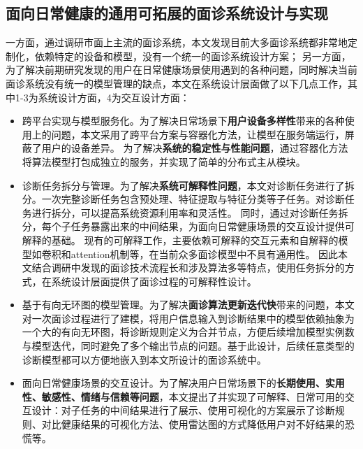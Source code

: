 \subsection{面向日常健康的通用可拓展的面诊系统设计与实现}
一方面，通过调研市面上主流的面诊系统，本文发现目前大多面诊系统都非常地定制化，依赖特定的设备和模型，没有一个统一的面诊系统设计方案；
另一方面，为了解决前期研究发现的用户在日常健康场景使用遇到的各种问题，同时解决当前面诊系统没有统一的模型管理的缺点，本文在系统设计层面做了以下几点工作，其中1-3为系统设计方面，4为交互设计方面：
\begin{itemize}

    \item 跨平台实现与模型服务化。为了解决日常场景下\textbf{用户设备多样性}带来的各种使用上的问题，本文采用了跨平台方案与容器化方法，让模型在服务端运行，屏蔽了用户的设备差异。
    为了解决\textbf{系统的稳定性与性能问题}，通过容器化方法将算法模型打包成独立的服务，并实现了简单的分布式主从模块。

    \item 诊断任务拆分与管理。为了解决\textbf{系统可解释性问题}，本文对诊断任务进行了拆分。一次完整诊断任务包含预处理、特征提取与特征分类等子任务。对诊断任务进行拆分，可以提高系统资源利用率和灵活性。
    同时，通过对诊断任务拆分，每个子任务暴露出来的中间结果，为面向日常健康场景的交互设计提供可解释的基础。
    现有的可解释工作，主要依赖可解释的交互元素和自解释的模型如卷积和attention机制等\cite{abdul2018trends}，在当前众多面诊模型中不具有通用性。
    因此本文结合调研中发现的面诊技术流程长和涉及算法多等特点，使用任务拆分的方式，在系统设计层面提供了面诊过程的可解释性设计。

    \item 基于有向无环图的模型管理。为了解决\textbf{面诊算法更新迭代快}带来的问题，本文对一次面诊过程进行了建模，将用户信息输入到诊断结果中的模型依赖抽象为一个大的有向无环图，将诊断规则定义为合并节点，方便后续增加模型实例数与模型迭代，同时避免了多个输出节点的问题。基于此设计，后续任意类型的诊断模型都可以方便地嵌入到本文所设计的面诊系统中。
    
    \item 面向日常健康场景的交互设计。为了解决用户日常场景下的\textbf{长期使用、实用性、敏感性、情绪与信赖等问题}，本文提出了并实现了可解释、日常可用的交互设计：对子任务的中间结果进行了展示、使用可视化的方案展示了诊断规则、对比健康结果的可视化方法、使用雷达图的方式降低用户对不好结果的恐慌等。

\end{itemize}

